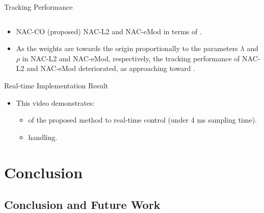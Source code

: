 \documentclass[8pt, aspectratio=169]{beamer}
\newcommand{\ctxt}[2]{\color{#1}{#2}\color{black} }
\begin{document}
\begin{frame}{\insertsubsectionhead}{Tracking Performance}
\begin{columns}
  \end{columns}

  \begin{itemize}
    \item NAC-CO (proposed) \ctxt{airforceblue}{outperformed } NAC-L2 and NAC-eMod in terms of \ctxt{awesome}{tracking performance}.
    \item As the weights are \ctxt{awesome}{biased }towards the origin proportionally to the parameters $\lambda$ and $\rho$ in NAC-L2 and NAC-eMod, respectively, the tracking performance of NAC-L2 and NAC-eMod deteriorated, as approaching toward \ctxt{airforceblue}{suboptimal points}.
  \end{itemize}

\end{frame}

\begin{frame}{Real-time Implementation Result}

  \begin{itemize}
    \item This video demonstrates:
    \begin{itemize}
      \item \ctxt{airforceblue}{Applicability }of the proposed method to real-time control (under 4 ms sampling time).
      \item \ctxt{awesome}{Convex input constraints } handling.
    \end{itemize}
  \end{itemize}

  \centering

\end{frame}

\section{Conclusion}

\subsection{Conclusion and Future Work}
\end{document}
